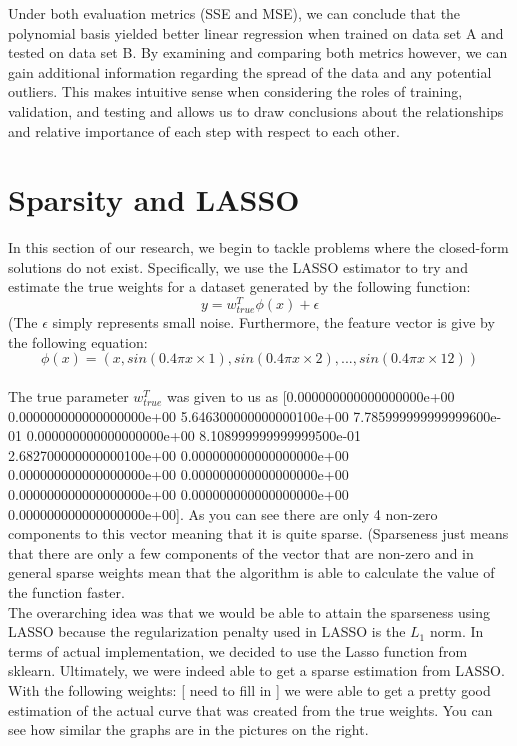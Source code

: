 \documentclass{article}
\begin{document}
Under both evaluation metrics (SSE and MSE), we can conclude that the polynomial basis yielded better linear regression when trained on data set A and tested on data set B. By examining and comparing both metrics however, we can gain additional information regarding the spread of the data and any potential outliers. This makes intuitive sense when considering the roles of training, validation, and testing and allows us to draw conclusions about the relationships and relative importance of each step with respect to each other.

\section{Sparsity and LASSO}
In this section of our research, we begin to tackle problems where the closed-form solutions do not exist. Specifically, we use the LASSO estimator to try and estimate the true weights for a dataset generated by the following function: \\ 

$$y = w^{T}_{true}\phi(x)+\epsilon$$ (The $\epsilon$ simply represents small noise. Furthermore, the feature vector is give by the following equation:\\

$$\phi(x) = (x,sin(0.4\pi x \times 1), sin(0.4\pi x \times 2), . . . , sin(0.4\pi x \times 12))$$\\

The true parameter $w^{T}_{true}$ was given to us as [0.000000000000000000e+00 0.000000000000000000e+00 5.646300000000000100e+00 7.785999999999999600e-01 0.000000000000000000e+00 8.108999999999999500e-01 2.682700000000000100e+00 0.000000000000000000e+00 0.000000000000000000e+00 0.000000000000000000e+00 0.000000000000000000e+00 0.000000000000000000e+00 0.000000000000000000e+00]. As you can see there are only 4 non-zero components to this vector meaning that it is quite sparse. (Sparseness just means that there are only a few components of the vector that are non-zero and in general sparse weights mean that the algorithm is able to calculate the value of the function faster.  \\

The overarching idea was that we would be able to attain the sparseness using LASSO because the regularization penalty used in LASSO is the $L_{1}$ norm. In terms of actual implementation, we decided to use the Lasso function from sklearn. Ultimately, we were indeed able to get a sparse estimation from LASSO. With the following weights: [ need to fill in ] we were able to get a pretty good estimation of the actual curve that was created from the true weights. You can see how similar the graphs are in the pictures on the right.
\end{document}
